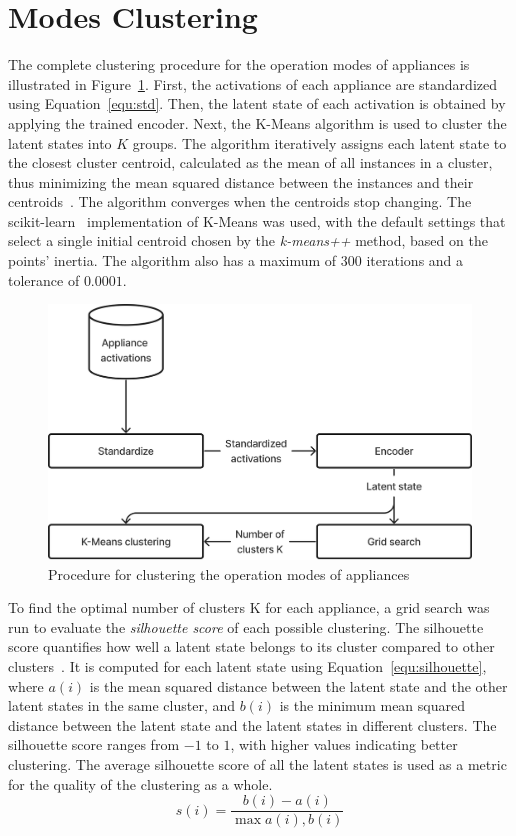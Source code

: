 \section{Modes Clustering}

The complete clustering procedure for the operation modes of appliances is illustrated in Figure~\ref{fig:clustering}. First, the activations of each appliance are standardized using Equation~\eqref{equ:std}. Then, the latent state of each activation is obtained by applying the trained encoder. Next, the K-Means algorithm is used to cluster the latent states into $K$ groups. The algorithm iteratively assigns each latent state to the closest cluster centroid, calculated as the mean of all instances in a cluster, thus minimizing the mean squared distance between the instances and their centroids~\parencite{lloydLeastSquaresQuantization1982}. The algorithm converges when the centroids stop changing. The scikit-learn~\parencite*{pedregosaScikitlearnMachineLearning2011, buitinckAPIDesignMachine2013} implementation of K-Means was used, with the default settings that select a single initial centroid chosen by the \textit{k-means++} method, based on the points’ inertia. The algorithm also has a maximum of $300$ iterations and a tolerance of $0.0001$.

\begin{figure}
  \centering
  \includegraphics[width=.5\linewidth]{images/modes_clustering/clustering.png}
  \caption{Procedure for clustering the operation modes of appliances}
  \label{fig:clustering}
\end{figure}

To find the optimal number of clusters K for each appliance, a grid search was run to evaluate the \textit{silhouette score} of each possible clustering. The silhouette score quantifies how well a latent state belongs to its cluster compared to other clusters~\parencite{rousseeuwSilhouettesGraphicalAid1987}. It is computed for each latent state using Equation~\eqref{equ:silhouette}, where $a(i)$ is the mean squared distance between the latent state and the other latent states in the same cluster, and $b(i)$ is the minimum mean squared distance between the latent state and the latent states in different clusters. The silhouette score ranges from $-1$ to $1$, with higher values indicating better clustering. The average silhouette score of all the latent states is used as a metric for the quality of the clustering as a whole.
\begin{equation}\label{equ:silhouette}
  s(i) = \frac{b(i) - a(i)}{\max{a(i), b(i)}}
\end{equation}

